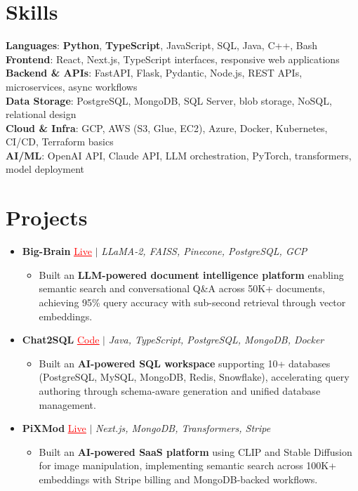 \documentclass[letterpaper,10pt]{article}
\newcommand{\resumeItem}[1]{\item\small{{#1 \vspace{-2pt}}}}
\newcommand{\resumeProjectHeading}[1]{\item \small #1 \vspace{-2pt}}
\newcommand{\resumeSubHeadingListStart}{\begin{itemize}[leftmargin=0.0in, label={}]}
\newcommand{\resumeSubHeadingListEnd}{\end{itemize}}
\newcommand{\resumeProjItemListStart}{\begin{itemize}[leftmargin=0.15in,label=\textbullet,itemsep=0pt,topsep=0pt,parsep=0pt,partopsep=0pt]}
\newcommand{\resumeProjItemListEnd}{\end{itemize}\vspace{-4pt}}
\begin{document}
\section{Skills}
\begin{itemize}[leftmargin=0.15in, label={}]
\small{\item{
\textbf{Languages}: \textbf{Python}, \textbf{TypeScript}, JavaScript, SQL, Java, C++, Bash \\
\textbf{Frontend}: React, Next.js, TypeScript interfaces, responsive web applications \\
\textbf{Backend \& APIs}: FastAPI, Flask, Pydantic, Node.js, REST APIs, microservices, async workflows \\
\textbf{Data Storage}: PostgreSQL, MongoDB, SQL Server, blob storage, NoSQL, relational design \\
\textbf{Cloud \& Infra}: GCP, AWS (S3, Glue, EC2), Azure, Docker, Kubernetes, CI/CD, Terraform basics \\
\textbf{AI/ML}: OpenAI API, Claude API, LLM orchestration, PyTorch, transformers, model deployment
}}
\end{itemize}
\vspace{-16pt}
\section{Projects}
\resumeSubHeadingListStart
\vspace{-2pt}
\resumeProjectHeading{\textbf{Big-Brain} {\href{https://big-brain-pied.vercel.app/}{\textcolor{red}{\underline{Live}}}} $|$ \emph{LLaMA-2, FAISS, Pinecone, PostgreSQL, GCP}}
\resumeProjItemListStart
\resumeItem{Built an \textbf{LLM-powered document intelligence platform} enabling semantic search and conversational Q\&A across 50K+ documents, achieving 95\% query accuracy with sub-second retrieval through vector embeddings.}
\resumeProjItemListEnd
\vspace{3pt}
\resumeProjectHeading{\textbf{Chat2SQL} {\href{https://github.com/SAHAJ-BHADJA/Chat2SQL}{\textcolor{red}{\underline{Code}}}} $|$ \emph{Java, TypeScript, PostgreSQL, MongoDB, Docker}}
\resumeProjItemListStart
\resumeItem{Built an \textbf{AI-powered SQL workspace} supporting 10+ databases (PostgreSQL, MySQL, MongoDB, Redis, Snowflake), accelerating query authoring through schema-aware generation and unified database management.}
\resumeProjItemListEnd
\vspace{3pt}
\resumeProjectHeading{\textbf{PiXMod} {\href{https://pixmod.vercel.app/}{\textcolor{red}{\underline{Live}}}} $|$ \emph{Next.js, MongoDB, Transformers, Stripe}}
\resumeProjItemListStart
\resumeItem{Built an \textbf{AI-powered SaaS platform} using CLIP and Stable Diffusion for image manipulation, implementing semantic search across 100K+ embeddings with Stripe billing and MongoDB-backed workflows.}
\resumeProjItemListEnd
\resumeSubHeadingListEnd
\end{document}
